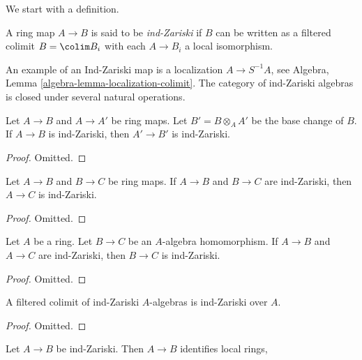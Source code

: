 \noindent
We start with a definition.

\begin{definition}
\label{definition-ind-zariski}
A ring map $A \to B$ is said to be {\it ind-Zariski} if $B$ can be written
as a filtered colimit $B = \colim B_i$ with each $A \to B_i$ a local
isomorphism.
\end{definition}

\noindent
An example of an Ind-Zariski map is a localization $A \to S^{-1}A$, see
Algebra, Lemma \ref{algebra-lemma-localization-colimit}.
The category of ind-Zariski algebras is closed under several natural
operations.

\begin{lemma}
\label{lemma-base-change-ind-zariski}
Let $A \to B$ and $A \to A'$ be ring maps. Let $B' = B \otimes_A A'$
be the base change of $B$.
If $A \to B$ is ind-Zariski, then $A' \to B'$ is ind-Zariski.
\end{lemma}

\begin{proof}
Omitted.
\end{proof}

\begin{lemma}
\label{lemma-composition-ind-zariski}
Let $A \to B$ and $B \to C$ be ring maps. If $A \to B$ and $B \to C$
are ind-Zariski, then $A \to C$ is ind-Zariski.
\end{lemma}

\begin{proof}
Omitted.
\end{proof}

\begin{lemma}
\label{lemma-ind-zariski-permanence}
Let $A$ be a ring. Let $B \to C$ be an $A$-algebra homomorphism.
If $A \to B$ and $A \to C$ are ind-Zariski, then $B \to C$
is ind-Zariski.
\end{lemma}

\begin{proof}
Omitted.
\end{proof}

\begin{lemma}
\label{lemma-ind-ind-zariski}
A filtered colimit of ind-Zariski $A$-algebras is ind-Zariski over $A$.
\end{lemma}

\begin{proof}
Omitted.
\end{proof}

\begin{lemma}
\label{lemma-ind-zariski-implies}
Let $A \to B$ be ind-Zariski. Then $A \to B$ identifies local rings,
\end{lemma}

